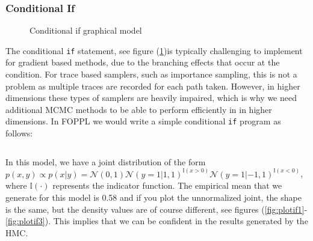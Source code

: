 \documentclass[twoside]{article}
\begin{document}
\subsubsection{Conditional If}
\begin{figure}[ht]
	\label{fig:conif}
	\begin{center}
		
	\end{center}
	\caption{Conditional if graphical model}
\end{figure}
The conditional \texttt{if} statement, see figure (\ref{fig:conif})is typically challenging to implement for gradient based methods, due to the branching effects that occur at the condition. For trace based samplers, such as importance sampling, this is not a problem as multiple traces are recorded for each path taken. However, in higher dimensions these types of samplers are heavily impaired, which is why we need additional MCMC methods to be able to perform efficiently in in higher dimensions. In FOPPL we would write a simple conditional \texttt{if} program as follows:\inputminted{clojure}{code/conditionalif.clj}
 In this model, we have a joint distribution of the form $p(x,y) \propto p(x|y) = \mathcal{N}(0,1)\mathcal{N}(y = 1|1,1)^{\mathbb{I}(x > 0)}\mathcal{N}(y = 1|-1,1)^{\mathbb{I}(x < 0)}$, where $\mathbb{I}(\cdot)$ represents the indicator function. The empirical mean that we generate for this model is 0.58 and if you plot the unnormalized joint, the shape is the same, but the density values are of course different, see figures (\ref{fig:plotif1}-\ref{fig:plotif3}). This implies that we can be confident in the results generated by the HMC.
\end{document}
